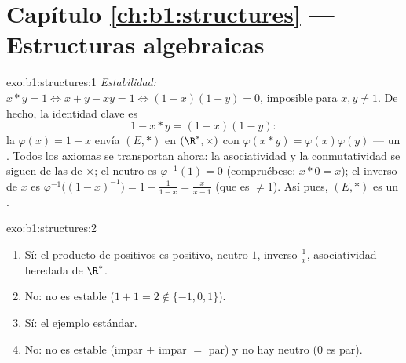 \section*{Capítulo \ref{ch:b1:structures} --- Estructuras algebraicas}

\begin{solution}{exo:b1:structures:1}
\emph{Estabilidad:} $x * y = 1 \iff x + y - xy = 1 \iff (1-x)(1-y) = 0$,
imposible para $x, y \neq 1$. De hecho, la identidad clave es
\[
1 - x * y = (1 - x)(1 - y):
\]
la  $\varphi(x) = 1 - x$ envía $(E, *)$ en
$(\R^*, \times)$ con $\varphi(x * y) = \varphi(x)\varphi(y)$ --- un
 . Todos los axiomas se transportan ahora: la
asociatividad y la conmutatividad se siguen de las de $\times$; el
neutro es $\varphi^{-1}(1) = 0$ (compruébese: $x * 0 = x$); el inverso
de $x$ es $\varphi^{-1}\bigl((1-x)^{-1}\bigr) = 1 - \frac{1}{1-x} =
\frac{x}{x - 1}$ (que es $\neq 1$). Así pues, $(E, *)$ es un
.
\end{solution}

\begin{solution}{exo:b1:structures:2}
\begin{enumerate}
  \item Sí: el producto de positivos es positivo, neutro $1$, inverso
        $\frac 1x$, asociatividad heredada de $\R^*$.
  \item No: no es estable ($1 + 1 = 2 \notin \{-1,0,1\}$).
  \item Sí: el ejemplo estándar.
  \item No: no es estable (impar $+$ impar $=$ par) y no hay neutro
        ($0$ es par).
\end{enumerate}
\end{solution}

